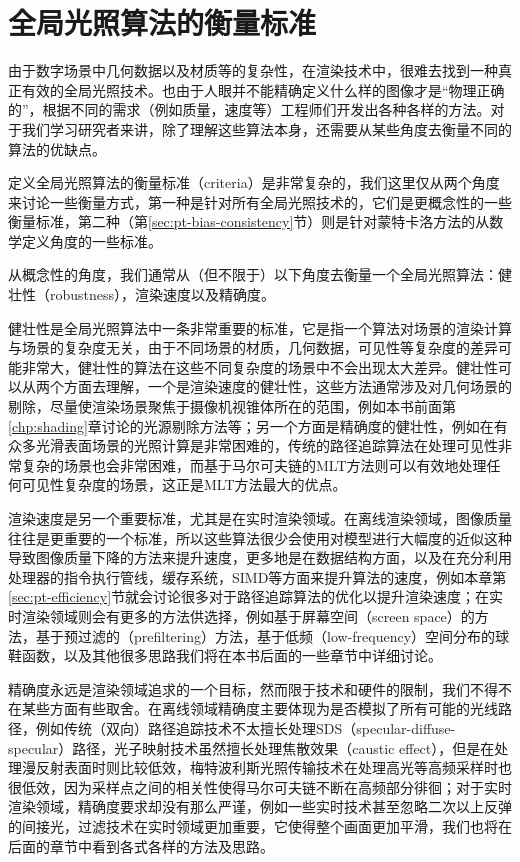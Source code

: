\section{全局光照算法的衡量标准}\label{sec:pt-criteria}
由于数字场景中几何数据以及材质等的复杂性，在渲染技术中，很难去找到一种真正有效的全局光照技术。也由于人眼并不能精确定义什么样的图像才是“物理正确的”，根据不同的需求（例如质量，速度等）工程师们开发出各种各样的方法。对于我们学习研究者来讲，除了理解这些算法本身，还需要从某些角度去衡量不同的算法的优缺点。

定义全局光照算法的衡量标准（criteria）是非常复杂的，我们这里仅从两个角度来讨论一些衡量方式，第一种是针对所有全局光照技术的，它们是更概念性的一些衡量标准，第二种（第\ref{sec:pt-bias-consistency}节）则是针对蒙特卡洛方法的从数学定义角度的一些标准。

从概念性的角度，我们通常从（但不限于）以下角度去衡量一个全局光照算法：健壮性（robustness），渲染速度以及精确度。

健壮性是全局光照算法中一条非常重要的标准，它是指一个算法对场景的渲染计算与场景的复杂度无关，由于不同场景的材质，几何数据，可见性等复杂度的差异可能非常大，健壮性的算法在这些不同复杂度的场景中不会出现太大差异。健壮性可以从两个方面去理解，一个是渲染速度的健壮性，这些方法通常涉及对几何场景的剔除，尽量使渲染场景聚焦于摄像机视锥体所在的范围，例如本书前面第\ref{chp:shading}章讨论的光源剔除方法等；另一个方面是精确度的健壮性，例如在有众多光滑表面场景的光照计算是非常困难的，传统的路径追踪算法在处理可见性非常复杂的场景也会非常困难，而基于马尔可夫链的MLT方法则可以有效地处理任何可见性复杂度的场景，这正是MLT方法最大的优点。

渲染速度是另一个重要标准，尤其是在实时渲染领域。在离线渲染领域，图像质量往往是更重要的一个标准，所以这些算法很少会使用对模型进行大幅度的近似这种导致图像质量下降的方法来提升速度，更多地是在数据结构方面，以及在充分利用处理器的指令执行管线，缓存系统，SIMD等方面来提升算法的速度，例如本章第\ref{sec:pt-efficiency}节就会讨论很多对于路径追踪算法的优化以提升渲染速度；在实时渲染领域则会有更多的方法供选择，例如基于屏幕空间（screen space）的方法，基于预过滤的（prefiltering）方法，基于低频（low-frequency）空间分布的球鞋函数，以及其他很多思路我们将在本书后面的一些章节中详细讨论。

精确度永远是渲染领域追求的一个目标，然而限于技术和硬件的限制，我们不得不在某些方面有些取舍。在离线领域精确度主要体现为是否模拟了所有可能的光线路径，例如传统（双向）路径追踪技术不太擅长处理SDS（specular-diffuse-specular）路径，光子映射技术虽然擅长处理焦散效果（caustic effect），但是在处理漫反射表面时则比较低效，梅特波利斯光照传输技术在处理高光等高频采样时也很低效，因为采样点之间的相关性使得马尔可夫链不断在高频部分徘徊；对于实时渲染领域，精确度要求却没有那么严谨，例如一些实时技术甚至忽略二次以上反弹的间接光，过滤技术在实时领域更加重要，它使得整个画面更加平滑，我们也将在后面的章节中看到各式各样的方法及思路。

